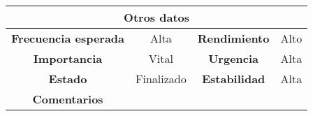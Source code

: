 \begin{table}[!h]
\begin{tabular}{|c|c|c|c|}
\hline
\multicolumn{4}{|c|}{\cellcolor{cyan} \textbf{Otros datos}} \\
\hline
 \cellcolor{cyan} \textbf{Frecuencia esperada}             &      Alta         &    \cellcolor{cyan} \textbf{Rendimiento}          &      Alto        \\
\hline
 \cellcolor{cyan} \textbf{Importancia}             &      Vital         &     \cellcolor{cyan} \textbf{Urgencia}         &      Alta        \\
\hline
 \cellcolor{cyan} \textbf{Estado}             &       Finalizado        &    \cellcolor{cyan} \textbf{Estabilidad}          &     Alta         \\
\hline
\cellcolor{cyan} \textbf{Comentarios}        &  \multicolumn{3}{|c|}{} \\
\hline
\end{tabular}
\end{table}











